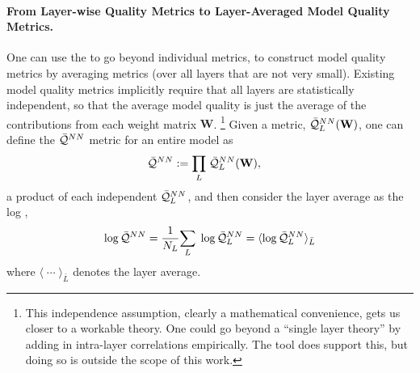 \paragraph{From Layer-wise Quality Metrics to Layer-Averaged Model Quality Metrics.}
One can use the \HTSR \Phenomenology to go beyond individual \LayerQuality metrics, to construct model quality metrics by averaging \LayerQuality metrics (over all layers that are not very small). 
Existing \HTSR model quality metrics implicitly require that all layers are statistically independent, so that the average model quality is just the average of the contributions from each weight matrix $\mathbf{W}$.%
\footnote{This independence assumption, clearly a mathematical convenience, gets us closer to a workable theory. One could go beyond a ``single layer theory'' by adding in intra-layer correlations empirically. The \WW tool does support this, but doing so is outside the scope of this work.}
%
Given a \LayerQuality metric, $\bar{\mathcal{Q}}^{NN}_{L}(\mathbf{W})$, one can define the \emph{\ModelQuality} $\bar{\mathcal{Q}}^{NN}$ metric for an entire model as 
\begin{align}
\label{eqn:ProductNorm}
\bar{\mathcal{Q}}^{NN}&:=\underset{L}{\prod}\;\bar{\mathcal{Q}}^{NN}_{L}(\mathbf{W}) ,
\end{align}
a product of each independent \LayerQuality $\bar{\mathcal{Q}}^{NN}_{L}$, and then consider the layer average as the log \emph{\LayerQuality},
\begin{align}
\label{eqn:LogProductNorm}
\log\bar{\mathcal{Q}}^{NN}=\frac{1}{N_{L}}\underset{L}{\sum}\;\log\bar{\mathcal{Q}}^{NN}_{L}=\langle\log\bar{\mathcal{Q}}^{NN}_{L}\rangle_{\bar{L}}
\end{align}
where $\langle\;\cdots\;\rangle_{\bar{L}}$ denotes the layer average.

